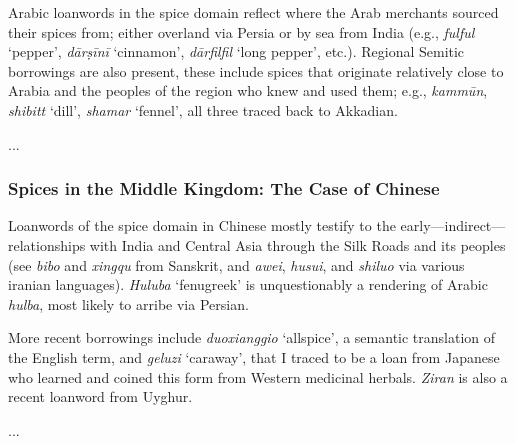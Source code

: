 Arabic loanwords in the spice domain reflect where the Arab merchants sourced their spices from; either overland via Persia or by sea from India (e.g., \textit{fulful} `pepper', \textit{dārṣīnī} `cinnamon', \textit{dārfilfil} `long pepper', etc.). Regional Semitic borrowings are also present, these include spices that originate relatively close to Arabia and the peoples of the region who knew and used them; e.g., \textit{kammūn}, \textit{shibitt} `dill', \textit{shamar} `fennel', all three traced back to Akkadian.

...

\subsubsection{Spices in the Middle Kingdom: The Case of Chinese }

Loanwords of the spice domain in Chinese mostly testify to the early---indirect---relationships with India and Central Asia through the Silk Roads and its peoples (see \textit{bibo} and \textit{xingqu} from Sanskrit, and \textit{awei}, \textit{husui}, and \textit{shiluo} via various iranian languages). \textit{Huluba} `fenugreek' is unquestionably a rendering of Arabic \textit{hulba}, most likely to arribe via Persian.

More recent borrowings include \textit{duoxianggio} `allspice', a semantic translation of the English term, and \textit{geluzi} `caraway', that I traced to be a loan from Japanese who learned and coined this form from Western medicinal herbals. \textit{Ziran} is also a recent loanword from Uyghur.

...

